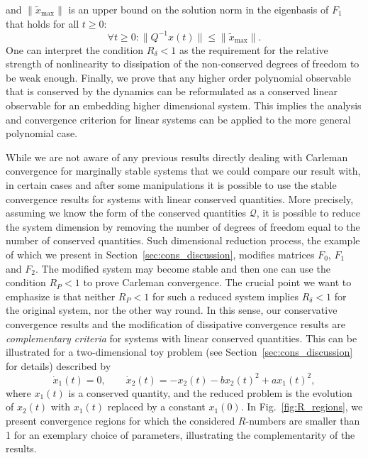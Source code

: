\documentclass[superscriptaddress,onecolumn,nofootinbib,longbibliography,a4paper,accepted=2026-09-29]{quantumarticle}
\theoremstyle{plain}
\theoremstyle{definition}
\numberwithin{thm}{section}
\numberwithin{assumption}{section}
\numberwithin{lemma}{section}
\numberwithin{prop}{section}
\numberwithin{cor}{section}
\numberwithin{definition}{section}
\numberwithin{rmk}{section}
\numberwithin{equation}{section}
\newcommand\Q{ {\mathcal Q} }
\newcommand{\mx}{\mathrm{max}}
\begin{document}
    and $\|\tilde{x}_{\mx}\|$ is an upper bound on the solution norm in the eigenbasis of $F_1$ that holds for all $t \ge 0$:
    \begin{equation}
        \forall t \ge 0: \|Q^{-1} x(t)\|\leq \|\tilde{x}_{\mx}\|.
    \end{equation}
     One can interpret the condition $R_\delta<1$ as the requirement for the relative strength of nonlinearity to dissipation of the non-conserved degrees of freedom to be weak enough. Finally, we prove that any higher order polynomial observable that is conserved by the dynamics can be reformulated as a conserved linear observable for an embedding higher dimensional system. This implies the analysis and convergence criterion for linear systems can be applied to the more general polynomial case.
     
     While we are not aware of any previous results directly dealing with Carleman convergence for marginally stable systems that we could compare our result with, in certain cases and after some manipulations it is possible to use the stable convergence results for systems with linear conserved quantities. More precisely, assuming we know the form of the conserved quantities $\Q$, it is possible to reduce the system dimension by removing the number of degrees of freedom equal to the number of conserved quantities. Such dimensional reduction process, the example of which we present in Section~\ref{sec:cons_discussion}, modifies matrices $F_0$, $F_1$ and $F_2$. The modified system may become stable and then one can use the condition $R_P<1$ to prove Carleman convergence. The crucial point we want to emphasize is that neither $R_P<1$ for such a reduced system implies $R_\delta<1$ for the original system, nor the other way round. In this sense, our conservative convergence results and the modification of dissipative convergence results are \emph{complementary criteria} for systems with linear conserved quantities. This can be illustrated for a two-dimensional toy problem (see Section~\ref{sec:cons_discussion} for details) described by
     \begin{equation}
     \label{eq:toy_cons}
         \dot{x}_1(t) = 0,\qquad \dot{x}_2(t) = -x_2(t) - b x_2(t)^2 + a x_1(t)^2,
     \end{equation}
     where $x_1(t)$ is a conserved quantity, and the reduced problem is the evolution of $x_2(t)$ with $x_1(t)$ replaced by a constant $x_1(0)$. In Fig.~\ref{fig:R_regions}, we present convergence regions for which the considered $R$-numbers are smaller than 1 for an exemplary choice of parameters, illustrating the complementarity of the results.
     
\end{document}
